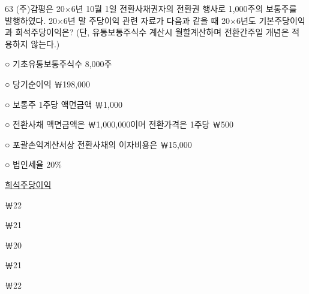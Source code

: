 \begin{question}{63}
(주)감평은 20×6년 10월 1일 전환사채권자의 전환권 행사로 1,000주의 보통주를 발행하였다. 20×6년 말 주당이익 관련 자료가 다음과 같을 때 20×6년도 기본주당이익과 희석주당이익은? (단, 유통보통주식수 계산시 월할계산하며 전환간주일 개념은 적용하지 않는다.)
\begin{framedtext}
○ 기초유통보통주식수 8,000주 \par
○ 당기순이익 ￦198,000 \par
○ 보통주 1주당 액면금액 ￦1,000 \par
○ 전환사채 액면금액은 ￦1,000,000이며 전환가격은 1주당 ￦500 \par
○ 포괄손익계산서상 전환사채의 이자비용은 ￦15,000 \par
○ 법인세율 20\% \par
\end{framedtext}

\noindent\hspace*{2em}\uline{희석주당이익}\par
\begin{choices}
  \item {}￦22
  \item {}￦21
  \item {}￦20
  \item {}￦21
  \item {}￦22
\end{choices}
\end{question}
